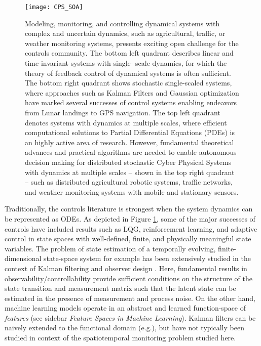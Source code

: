 \begin{figure}[h] %
	\centering
	\texttt{[image: CPS\_SOA]}
		\caption{Modeling, monitoring, and controlling dynamical systems with complex and uncertain dynamics, such as agricultural, traffic, or weather monitoring systems, presents exciting open challenge for the controls community. The bottom left quadrant describes linear and time-invariant systems with single- scale dynamics, for which the theory of feedback control of dynamical systems is often sufficient. The bottom right quadrant shows stochastic single-scaled systems, where approaches such as Kalman Filters and Gaussian optimization have marked several successes of control systems enabling endeavors from Lunar landings to GPS navigation. The top left quadrant denotes systems with dynamics at multiple scales, where efficient computational solutions to Partial Differential Equations (PDEs) is an highly active area of research. However, fundamental theoretical advances and practical algorithms are needed to enable autonomous decision making for distributed stochastic Cyber Physical Systems with dynamics at multiple scales – shown in the top right quadrant – such as distributed agricultural robotic systems, traffic networks, and weather monitoring systems with mobile and stationary sensors.}
	\label{fig:cps_soa}
\end{figure}
  
Traditionally, the controls literature is strongest when the system dynamics can be represented as ODEs. %
As depicted in Figure \ref{fig:cps_soa}, some of the major successes of controls have included results such as LQG, reinforcement learning, and adaptive control in state spaces with well-defined, finite, and physically meaningful state variables. The problem of state estimation of a temporally evolving, finite-dimensional state-space system for example has been extensively studied in the context of Kalman filtering and observer design \cite{Gelb74}. Here, fundamental results in observability/controllability provide sufficient conditions on the structure of the state transition and measurement matrix such that the latent state can be estimated in the presence of measurement and process noise. %
On the other hand, machine learning models operate in an abstract and learned function-space of \textit{features} (see sidebar \emph{Feature Spaces in Machine Learning}). Kalman filters can be naively extended to the functional domain (e.g.\cite{mardia1998kriged}), but have not typically been studied in context of the spatiotemporal monitoring problem studied here.  


